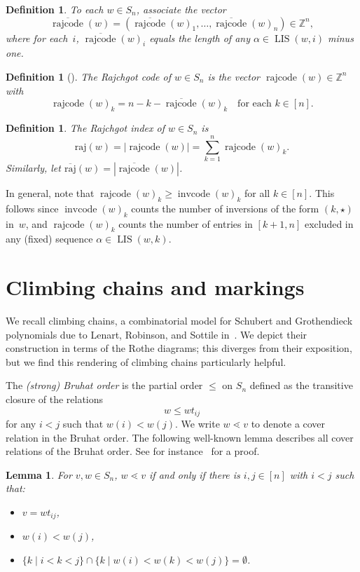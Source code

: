 \documentclass[10pt,a4paper]{amsart}
\newcommand{\absrajcode}[1]{\mathrm{raj}(#1)}
\newcommand{\absoverrajcode}[1]{\overline{\mathrm{raj}}(#1)}
\DeclareMathOperator{\LIS}{\mathrm{LIS}}
\DeclareMathOperator{\cc}{\mathrm{invcode}}
\DeclareMathOperator{\rr}{\mathrm{rajcode}}
\newcommand{\orr}{\overline{\rr}}
\newtheorem{lemma}[theorem]{Lemma}
\newtheorem{definition}[theorem]{Definition}
\begin{document}
\setcounter{section}{3}\setcounter{theorem}{1}
\begin{definition}
	To each $w\in S_n$, associate the vector 
	\[\orr(w)=(\orr(w)_1,\ldots,\orr(w)_n)\in\mathbb{Z}^n,\]
	where for each~$i$, $\orr(w)_i$ equals the length of any $\alpha\in \LIS(w,i)$ minus one. 
\end{definition}

\setcounter{section}{3}\setcounter{theorem}{2}
\begin{definition}[{\cite{PSW}}]
	The \emph{Rajchgot code} of $w\in S_n$ is the vector $\rr(w)\in \mathbb{Z}^n$ with 
	\[\rr(w)_k = n-k - \orr(w)_k \quad\mbox{for each } k\in [n]. \]
\end{definition}

\setcounter{section}{3}\setcounter{theorem}{3}
\begin{definition}
	The \emph{Rajchgot index} of $w\in S_n$ is
	\[\absrajcode{w} = |\rr(w)| = \sum_{k=1}^n \rr(w)_k.\]
	Similarly, let $\absoverrajcode{w} = |\orr(w)|$.
\end{definition}

In general, note that $\rr(w)_k\geq \cc(w)_k$ for all $k\in [n]$. This follows since $\cc(w)_k$ counts the number of inversions of the form $(k,\star)$ in~$w$, and $\rr(w)_k$ counts the number of entries in $[k+1,n]$ excluded in any (fixed) sequence $\alpha\in \LIS(w,k)$.

\section{Climbing chains and markings}
We recall climbing chains, a combinatorial model for Schubert and Grothendieck polynomials due to Lenart, Robinson, and Sottile in~\cite{LRS}. We depict their construction in terms of the Rothe diagrams; this diverges from their exposition, but we find this rendering of climbing chains particularly helpful. 

The \emph{(strong) Bruhat order} is the partial order $\leq$ on $S_n$ defined as the transitive closure of the relations 
\[w\leq wt_{ij} \]
for any $i<j$ such that $w(i)<w(j)$.
We write $w\lessdot v$ to denote a cover relation in the Bruhat order. The following well-known lemma describes all cover relations of the Bruhat order. See for instance~\cite[Lemma 2.1.4]{combcoxgroups} for a proof.

\setcounter{section}{4}\setcounter{theorem}{0}
\begin{lemma}
	\label{lem:cover}
	For $v,w\in S_n$, $w\lessdot v$ if and only if there is $i,j\in [n]$ with $i<j$ such that:
	\begin{itemize}
		\item $v=wt_{ij}$,
		\item $w(i)<w(j)$,
		\item $\{k \mid i<k<j\}\cap \{k\mid w(i)<w(k)<w(j) \}=\emptyset$.
	\end{itemize}
\end{lemma}
\end{document}
